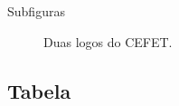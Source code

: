 \begin{slide}{Subfiguras}
  \begin{figure}[ht!]
    \centering
    \qquad
    \caption{Duas logos do CEFET.}
  \end{figure}
\end{slide}

\subsection{Tabela}

